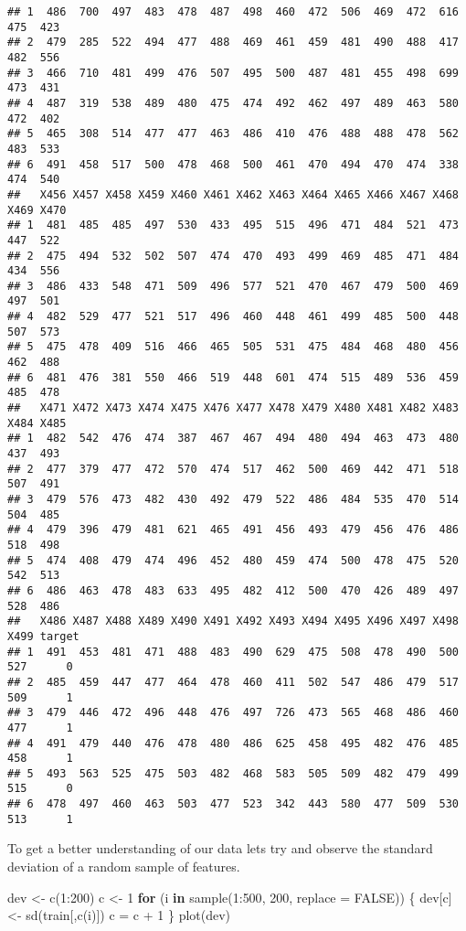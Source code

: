 \documentclass[
]{article}
\newenvironment{Shaded}{\begin{snugshade}}{\end{snugshade}}
\newcommand{\AttributeTok}[1]{\textcolor[rgb]{0.77,0.63,0.00}{#1}}
\newcommand{\ConstantTok}[1]{\textcolor[rgb]{0.00,0.00,0.00}{#1}}
\newcommand{\ControlFlowTok}[1]{\textcolor[rgb]{0.13,0.29,0.53}{\textbf{#1}}}
\newcommand{\DecValTok}[1]{\textcolor[rgb]{0.00,0.00,0.81}{#1}}
\newcommand{\FunctionTok}[1]{\textcolor[rgb]{0.00,0.00,0.00}{#1}}
\newcommand{\NormalTok}[1]{#1}
\newcommand{\OtherTok}[1]{\textcolor[rgb]{0.56,0.35,0.01}{#1}}
\newcommand{\SpecialCharTok}[1]{\textcolor[rgb]{0.00,0.00,0.00}{#1}}
\begin{document}
\begin{verbatim}
## 1  486  700  497  483  478  487  498  460  472  506  469  472  616  475  423
## 2  479  285  522  494  477  488  469  461  459  481  490  488  417  482  556
## 3  466  710  481  499  476  507  495  500  487  481  455  498  699  473  431
## 4  487  319  538  489  480  475  474  492  462  497  489  463  580  472  402
## 5  465  308  514  477  477  463  486  410  476  488  488  478  562  483  533
## 6  491  458  517  500  478  468  500  461  470  494  470  474  338  474  540
##   X456 X457 X458 X459 X460 X461 X462 X463 X464 X465 X466 X467 X468 X469 X470
## 1  481  485  485  497  530  433  495  515  496  471  484  521  473  447  522
## 2  475  494  532  502  507  474  470  493  499  469  485  471  484  434  556
## 3  486  433  548  471  509  496  577  521  470  467  479  500  469  497  501
## 4  482  529  477  521  517  496  460  448  461  499  485  500  448  507  573
## 5  475  478  409  516  466  465  505  531  475  484  468  480  456  462  488
## 6  481  476  381  550  466  519  448  601  474  515  489  536  459  485  478
##   X471 X472 X473 X474 X475 X476 X477 X478 X479 X480 X481 X482 X483 X484 X485
## 1  482  542  476  474  387  467  467  494  480  494  463  473  480  437  493
## 2  477  379  477  472  570  474  517  462  500  469  442  471  518  507  491
## 3  479  576  473  482  430  492  479  522  486  484  535  470  514  504  485
## 4  479  396  479  481  621  465  491  456  493  479  456  476  486  518  498
## 5  474  408  479  474  496  452  480  459  474  500  478  475  520  542  513
## 6  486  463  478  483  633  495  482  412  500  470  426  489  497  528  486
##   X486 X487 X488 X489 X490 X491 X492 X493 X494 X495 X496 X497 X498 X499 target
## 1  491  453  481  471  488  483  490  629  475  508  478  490  500  527      0
## 2  485  459  447  477  464  478  460  411  502  547  486  479  517  509      1
## 3  479  446  472  496  448  476  497  726  473  565  468  486  460  477      1
## 4  491  479  440  476  478  480  486  625  458  495  482  476  485  458      1
## 5  493  563  525  475  503  482  468  583  505  509  482  479  499  515      0
## 6  478  497  460  463  503  477  523  342  443  580  477  509  530  513      1
\end{verbatim}

To get a better understanding of our data lets try and observe the
standard deviation of a random sample of features.

\begin{Shaded}
\begin{Highlighting}[]
\NormalTok{dev }\OtherTok{\textless{}{-}} \FunctionTok{c}\NormalTok{(}\DecValTok{1}\SpecialCharTok{:}\DecValTok{200}\NormalTok{)}
\NormalTok{c }\OtherTok{\textless{}{-}} \DecValTok{1}
\ControlFlowTok{for}\NormalTok{ (i }\ControlFlowTok{in} \FunctionTok{sample}\NormalTok{(}\DecValTok{1}\SpecialCharTok{:}\DecValTok{500}\NormalTok{, }\DecValTok{200}\NormalTok{, }\AttributeTok{replace =} \ConstantTok{FALSE}\NormalTok{)) \{}
\NormalTok{  dev[c] }\OtherTok{\textless{}{-}} \FunctionTok{sd}\NormalTok{(train[,}\FunctionTok{c}\NormalTok{(i)])}
\NormalTok{  c }\OtherTok{=}\NormalTok{ c }\SpecialCharTok{+} \DecValTok{1}
\NormalTok{\}}
\FunctionTok{plot}\NormalTok{(dev)}
\end{Highlighting}
\end{Shaded}
\end{document}
